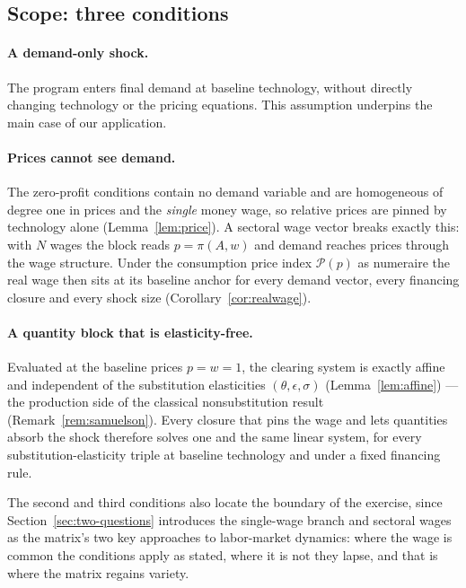 \subsection*{Scope: three conditions}

\paragraph{A demand-only shock.} The program enters final demand at
baseline technology, without directly changing technology or the pricing equations. This assumption underpins the main case of our application.

\paragraph{Prices cannot see demand.} The zero-profit conditions
contain no demand variable and are homogeneous of degree one in prices and the
\emph{single} money wage, so relative prices are pinned by technology alone
(Lemma~\ref{lem:price}). A sectoral wage vector breaks exactly this: with $N$
wages the block reads $p=\pi(A,w)$ and demand reaches prices through the wage
structure. Under the consumption price index $\mathcal{P}(p)$ as numeraire the real wage then sits at its baseline anchor for every demand vector, every financing closure and every shock size (Corollary~\ref{cor:realwage}). 

\paragraph{A quantity block that is elasticity-free.} Evaluated at the baseline
prices $p=w=1$, the clearing system is exactly affine and independent of the
substitution elasticities $(\theta,\epsilon,\sigma)$ (Lemma~\ref{lem:affine})
--- the production side of the classical nonsubstitution result
(Remark~\ref{rem:samuelson}). Every closure that pins the wage and lets
quantities absorb the shock therefore solves one and the same linear system, for
every substitution-elasticity triple at baseline technology and under a fixed
financing rule.

The second and third conditions also locate the boundary of the exercise,
since Section~\ref{sec:two-questions} introduces the single-wage branch and
sectoral wages as the matrix's two key approaches to labor-market dynamics:
where the wage is common the conditions apply as stated, where it is not they
lapse, and that is where the matrix regains variety.

